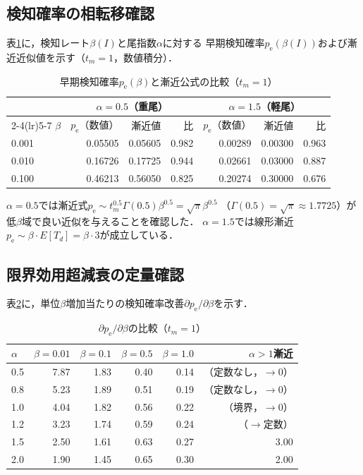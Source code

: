 \documentclass[12pt,a4paper]{article}
\theoremstyle{plain}
\theoremstyle{definition}
\theoremstyle{remark}
\newcommand{\pe}{p_{\mathrm{e}}}
\newcommand{\betaI}{\beta(I)}
\begin{document}
\subsection{検知確率の相転移確認}

表\ref{tab:phase_verify}に，検知レート$\betaI$と尾指数$\alpha$に対する
早期検知確率$\pe(\betaI)$および漸近近似値を示す（$t_m=1$，数値積分）．

\begin{table}[h]
\centering
\caption{早期検知確率$\pe(\beta)$と漸近公式の比較（$t_m=1$）}
\label{tab:phase_verify}
\begin{tabular}{@{}lrrrrrr@{}}
\toprule
 & \multicolumn{3}{c}{$\alpha=0.5$（重尾）} & \multicolumn{3}{c}{$\alpha=1.5$（軽尾）} \\
\cmidrule(lr){2-4}\cmidrule(lr){5-7}
$\beta$ & $\pe$（数値） & 漸近値 & 比 & $\pe$（数値） & 漸近値 & 比 \\
\midrule
0.001 & 0.05505 & 0.05605 & 0.982 & 0.00289 & 0.00300 & 0.963 \\
0.010 & 0.16726 & 0.17725 & 0.944 & 0.02661 & 0.03000 & 0.887 \\
0.100 & 0.46213 & 0.56050 & 0.825 & 0.20274 & 0.30000 & 0.676 \\
\bottomrule
\end{tabular}
\end{table}

$\alpha=0.5$では漸近式$\pe\sim t_m^{0.5}\Gamma(0.5)\beta^{0.5}=\sqrt{\pi}\beta^{0.5}$
（$\Gamma(0.5)=\sqrt\pi\approx1.7725$）が低$\beta$域で良い近似を与えることを確認した．
$\alpha=1.5$では線形漸近$\pe\sim\beta\cdot E[T_d]=\beta\cdot3$が成立している．

\subsection{限界効用超減衰の定量確認}

表\ref{tab:marginal}に，単位$\beta$増加当たりの検知確率改善$\partial\pe/\partial\beta$を示す．

\begin{table}[h]
\centering
\caption{$\partial\pe/\partial\beta$の比較（$t_m=1$）}
\label{tab:marginal}
\begin{tabular}{@{}lrrrrr@{}}
\toprule
$\alpha$ & $\beta=0.01$ & $\beta=0.1$ & $\beta=0.5$ & $\beta=1.0$ & $\alpha>1$漸近 \\
\midrule
0.5 & 7.87 & 1.83 & 0.40 & 0.14 & （定数なし，$\to0$） \\
0.8 & 5.23 & 1.89 & 0.51 & 0.19 & （定数なし，$\to0$） \\
1.0 & 4.04 & 1.82 & 0.56 & 0.22 & （境界，$\to0$） \\
1.2 & 3.23 & 1.74 & 0.59 & 0.24 & （$\to$定数） \\
1.5 & 2.50 & 1.61 & 0.63 & 0.27 & 3.00 \\
2.0 & 1.90 & 1.45 & 0.65 & 0.30 & 2.00 \\
\bottomrule
\end{tabular}
\end{table}
\end{document}
